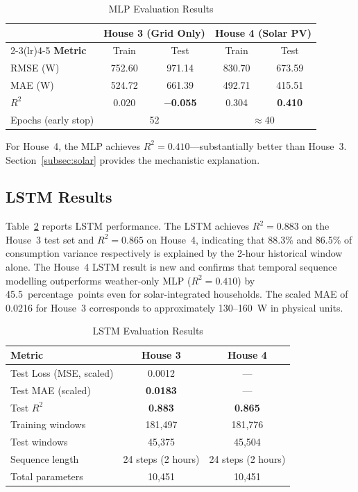 \documentclass[12pt,a4paper]{article}
\begin{document}
\begin{table}[h]
\centering
\caption{MLP Evaluation Results}
\label{tab:mlp}
\begin{tabular}{lcccc}
\toprule
& \multicolumn{2}{c}{\textbf{House 3 (Grid Only)}} & \multicolumn{2}{c}{\textbf{House 4 (Solar PV)}} \\
\cmidrule(lr){2-3}\cmidrule(lr){4-5}
\textbf{Metric} & Train & Test & Train & Test \\
\midrule
RMSE (W) & 752.60 & 971.14 & 830.70 & 673.59 \\
MAE (W)  & 524.72 & 661.39 & 492.71 & 415.51 \\
$R^2$    & 0.020  & \textbf{$-$0.055} & 0.304 & \textbf{0.410} \\
\midrule
Epochs (early stop) & \multicolumn{2}{c}{52} & \multicolumn{2}{c}{${\approx}$40} \\
\bottomrule
\end{tabular}
\end{table}

For House~4, the MLP achieves $R^2 = 0.410$---substantially better than
House~3. Section~\ref{subsec:solar} provides the mechanistic explanation.

\subsection{LSTM Results}

Table~\ref{tab:lstm} reports LSTM performance. The LSTM achieves $R^2 = 0.883$
on the House~3 test set and $R^2 = 0.865$ on House~4, indicating that 88.3\%
and 86.5\% of consumption variance respectively is explained by the 2-hour
historical window alone. The House~4 LSTM result is new and confirms that
temporal sequence modelling outperforms weather-only MLP ($R^2 = 0.410$) by
45.5~percentage~points even for solar-integrated households. The scaled MAE of
0.0216 for House~3 corresponds to approximately 130--160~W in physical units.

\begin{table}[h]
\centering
\caption{LSTM Evaluation Results}
\label{tab:lstm}
\begin{tabular}{lcc}
\toprule
\textbf{Metric} & \textbf{House 3} & \textbf{House 4} \\
\midrule
Test Loss (MSE, scaled) & 0.0012 & --- \\
Test MAE (scaled)       & \textbf{0.0183} & --- \\
Test $R^2$              & \textbf{0.883}  & \textbf{0.865} \\
Training windows        & 181,497 & 181,776 \\
Test windows            & 45,375  & 45,504  \\
Sequence length         & 24 steps (2 hours) & 24 steps (2 hours) \\
Total parameters        & 10,451  & 10,451 \\
\bottomrule
\end{tabular}
\end{table}
\end{document}
